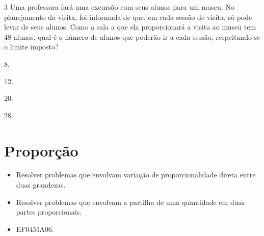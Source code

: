 \begin{mdframed}[linewidth=2pt,linecolor=salmao,roundcorner=2pt]
\begin{escolha}
{\begin{escolha}
\num{3} Uma professora fará uma excursão com seus alunos para um museu. No
planejamento da visita, foi informada de que, em cada sessão de visita, só
pode levar  de seus alunos. Como a sala a que ela proporcionará a
visita ao museu tem 48 alunos, qual é o número de alunos que poderão ir a
cada sessão, respeitando-se o limite imposto?

\begin{escolha}
\item
  8.

\item
  12.

\item
  20.

\item
  28.
\end{escolha}

\chapter{Proporção}


\begin{itemize}
\item Resolver problemas que envolvam variação de proporcionalidade direta
entre duas grandezas.

\item Resolver problemas que envolvam a partilha de uma quantidade em duas
partes proporcionais.
\end{itemize}


\begin{itemize}
\item EF04MA06.
\end{itemize}

\end{escolha}}
\end{escolha}
\end{mdframed}
